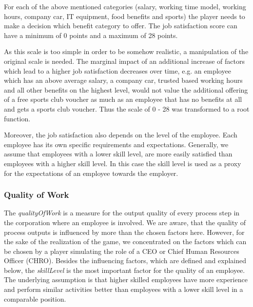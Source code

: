 For each of the above mentioned categories (salary, working time model, working hours, company car, IT equipment, food benefits and sports) the player needs to make a decision which benefit category to offer. The job satisfaction score can have a minimum of 0 points and a maximum of 28 points.

As this scale is too simple in order to be somehow realistic, a manipulation of the original scale is needed. The marginal impact of an additional increase of factors which lead to a higher job satisfaction decreases over time, e.g. an employee which has an above average salary, a company car, trusted based working hours and all other benefits on the highest level, would not value the additional offering of a free sports club voucher as much as an employee that has no benefits at all and gets a sports club voucher. Thus the scale of 0 - 28 was transformed to a root function.

Moreover, the job satisfaction also depends on the level of the employee. Each employee has its own specific requirements and expectations. Generally, we assume that employees with a lower skill level, are more easily satisfied than employees with a higher skill level. In this case the skill level  is used as a proxy for the expectations of an employee towards the employer. 


\subsubsection{Quality of Work}
The \textit{qualityOfWork} is a measure for the output quality of every process step in the corporation where an employee is involved. We are aware, that the quality of process outputs is influenced by more than the chosen factors here. However, for the sake of the realization of the game, we concentrated on the factors which can be chosen by a player simulating the role of a CEO or Chief Human Resources Officer (CHRO). Besides the influencing factors, which are defined and explained below, the \textit{skillLevel} is the most important factor for the quality of an employee. The underlying assumption is that higher skilled employees have more experience and perform similar activities better than employees with a lower skill level in a comparable position.


